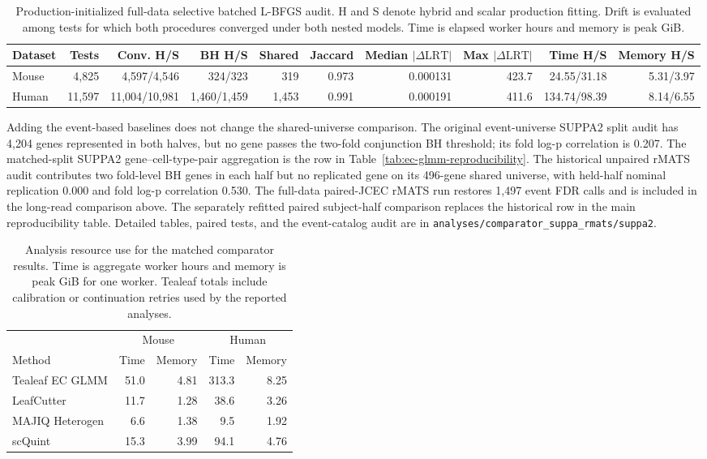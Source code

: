 \documentclass[11pt]{article}
\begin{document}
\begin{table}[H]
\centering
\tiny
\caption{Production-initialized full-data selective batched L-BFGS audit. H and S denote hybrid and scalar production fitting. Drift is evaluated among tests for which both procedures converged under both nested models. Time is elapsed worker hours and memory is peak GiB.}
\label{tab:hybrid-batched-full}
\begin{tabular}{lrrrrrrrrr}
\toprule
Dataset & Tests & Conv. H/S & BH H/S & Shared & Jaccard & Median $|\Delta\mathrm{LRT}|$ & Max $|\Delta\mathrm{LRT}|$ & Time H/S & Memory H/S\\
\midrule
Mouse & 4,825 & 4,597/4,546 & 324/323 & 319 & 0.973 & 0.000131 & 423.7 & 24.55/31.18 & 5.31/3.97\\
Human & 11,597 & 11,004/10,981 & 1,460/1,459 & 1,453 & 0.991 & 0.000191 & 411.6 & 134.74/98.39 & 8.14/6.55\\
\bottomrule
\end{tabular}
\end{table}

Adding the event-based baselines does not change the shared-universe comparison. The original event-universe SUPPA2 split audit has 4,204 genes represented in both halves, but no gene passes the two-fold conjunction BH threshold; its fold log-p correlation is 0.207. The matched-split SUPPA2 gene--cell-type-pair aggregation is the row in Table~\ref{tab:ec-glmm-reproducibility}. The historical unpaired rMATS audit contributes two fold-level BH genes in each half but no replicated gene on its 496-gene shared universe, with held-half nominal replication 0.000 and fold log-p correlation 0.530. The full-data paired-JCEC rMATS run restores 1,497 event FDR calls and is included in the long-read comparison above. The separately refitted paired subject-half comparison replaces the historical row in the main reproducibility table. Detailed tables, paired tests, and the event-catalog audit are in \texttt{analyses/comparator\_suppa\_rmats/suppa2}.

\begin{table}[H]
\centering
\scriptsize
\caption{Analysis resource use for the matched comparator results. Time is aggregate worker hours and memory is peak GiB for one worker. Tealeaf totals include calibration or continuation retries used by the reported analyses.}
\label{tab:method-resources}
\begin{tabular}{lrr@{\qquad}rr}
\toprule
& \multicolumn{2}{c}{Mouse} & \multicolumn{2}{c}{Human}\\
\cmidrule(lr){2-3}\cmidrule(lr){4-5}
Method & Time & Memory & Time & Memory\\
\midrule
Tealeaf EC GLMM & 51.0 & 4.81 & 313.3 & 8.25\\
LeafCutter & 11.7 & 1.28 & 38.6 & 3.26\\
MAJIQ Heterogen & 6.6 & 1.38 & 9.5 & 1.92\\
scQuint & 15.3 & 3.99 & 94.1 & 4.76\\
\bottomrule
\end{tabular}
\end{table}
\end{document}
